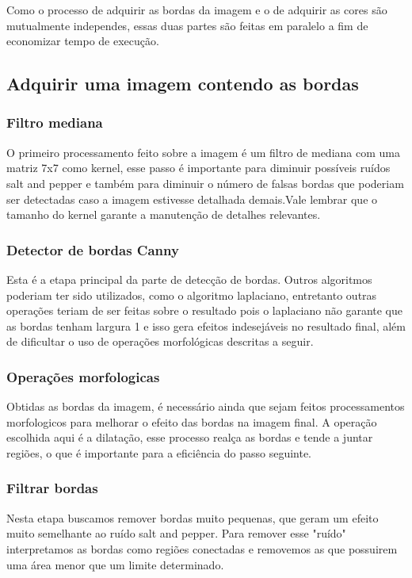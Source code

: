\documentclass[10pt,technote]{IEEEtran}
\begin{document}
	Como o processo de adquirir as bordas da imagem e o de adquirir as cores são mutualmente independes, essas duas partes são feitas em paralelo a fim de economizar tempo de execução.
	
	\subsection{Adquirir uma imagem contendo as bordas}
		\subsubsection{Filtro mediana}
			O primeiro processamento feito sobre a imagem é um filtro de mediana com uma matriz 7x7 como kernel, esse passo é importante para diminuir possíveis ruídos salt and pepper e também para diminuir o número de falsas bordas que poderiam ser detectadas caso a imagem estivesse detalhada demais.Vale lembrar que o tamanho do kernel garante a manutenção de detalhes relevantes.
			
		\subsubsection{Detector de bordas Canny}
			Esta é a etapa principal da parte de detecção de bordas. Outros algoritmos poderiam ter sido utilizados, como o algoritmo laplaciano, entretanto outras operações teriam de ser feitas sobre o resultado pois o laplaciano não garante que as bordas tenham largura 1 e isso gera efeitos indesejáveis no resultado final, além de dificultar o uso de operações morfológicas descritas a seguir.
			
		\subsubsection{Operações morfologicas}
			Obtidas as bordas da imagem, é necessário ainda que sejam feitos processamentos morfologicos para melhorar o efeito das bordas na imagem final. A operação escolhida aqui é a dilatação, esse processo realça as bordas e tende a juntar regiões, o que é importante para a eficiência do passo seguinte.
			
		\subsubsection{Filtrar bordas}
			Nesta etapa buscamos remover bordas muito pequenas, que geram um efeito muito semelhante ao ruído salt and pepper. Para remover esse "ruído" interpretamos as bordas como regiões conectadas e removemos as que possuirem uma área menor que um limite determinado.
		
\end{document}
